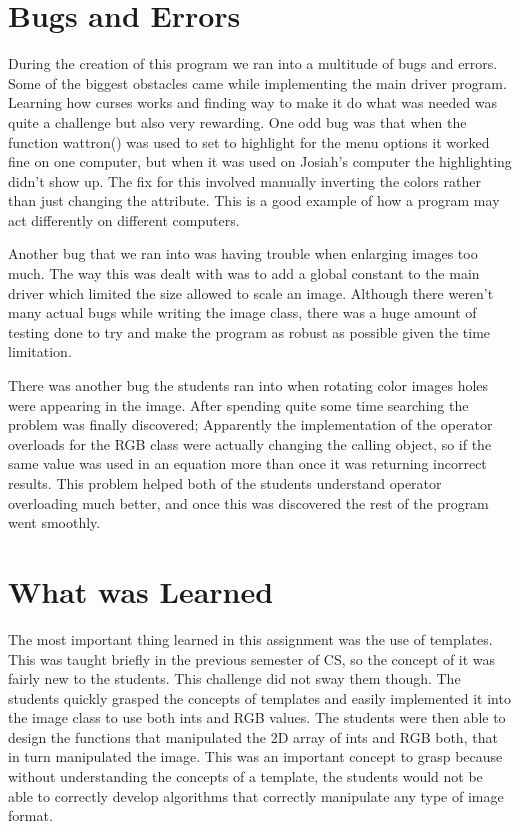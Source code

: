 \documentclass[pdftex, 11pt]{article}
\begin{document}
\section{Bugs and Errors}

	During the creation of this program we ran into a multitude of bugs and errors.  Some of the biggest obstacles came
while implementing the main driver program.  Learning how curses works and finding way to make it do what was needed was
quite a challenge but also very rewarding.  One odd bug was that when the function wattron() was used to set to
highlight for the menu options it worked fine on one computer, but when it was used on Josiah's computer the
highlighting didn't show up.  The fix for this involved manually inverting the colors rather than just changing the
attribute.  This is a good example of how a program may act differently on different computers.

	Another bug that we ran into was having trouble when enlarging images too much.  The way this was dealt with was to add a
global constant to the main driver which limited the size allowed to scale an image.  Although there weren't many actual
bugs while writing the image class, there was a huge amount of testing done to try and make the program as robust as
possible given the time limitation.

	There was another bug the students ran into when rotating color images holes were appearing in the image.  After
spending quite some time searching the problem was finally discovered;  Apparently the implementation of the operator
overloads for the RGB class were actually changing the calling object, so if the same value was used in an equation more
than once it was returning incorrect results.  This problem helped both of the students understand operator overloading
much better, and once this was discovered the rest of the program went smoothly.

\section{What was Learned}

	The most important thing learned in this assignment was the use of templates. This was taught briefly in the previous
semester of CS, so the concept of it was fairly new to the students. This challenge did not sway them though. The
students quickly grasped the concepts of templates and easily implemented it into the image class to use both ints and
RGB values. The students were then able to design the functions that manipulated the 2D array of ints and RGB both, that
in turn manipulated the image. This was an important concept to grasp because without understanding the concepts of a
template, the students would not be able to correctly develop algorithms that correctly manipulate any type of image
format.
\end{document}
